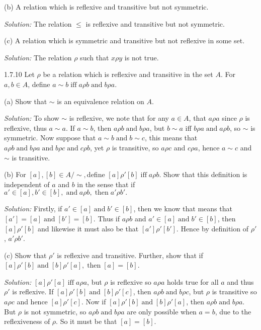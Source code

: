 \documentclass{letter}
\newcommand{\tmop}[1]{\ensuremath{\operatorname{#1}}}
\newcommand{\tmtextit}[1]{{\itshape{#1}}}
\begin{document}
(b) A relation which is reflexive and transitive but not symmetric.

\tmtextit{Solution:} The relation $\leq$ is reflexive and transitive but not
symmetric.

(c) A relation which is symmetric and transitive but not reflexive in some
set.

\tmtextit{Solution:} The relation $\rho$ such that $x \rho y$ is not true.

1.7.10 Let $\rho$ be a relation which is reflexive and transitive in the set
$A$. For $a, b \in A$, define $a \sim b \tmop{iff} a \rho b \tmop{and} b \rho
a$.

(a) Show that $\sim$ is an equivalence relation on $A$.

\tmtextit{Solution:} To show $\sim$ is reflexive, we note that for any $a \in
A$, that $a \rho a$ since $\rho$ is reflexive, thus $a \sim a$. If $a \sim b$,
then $a \rho b \tmop{and} b \rho a$, but $b \sim a$ iff $b \rho a \tmop{and} a
\rho b$, so $\sim$ is symmetric. Now suppose that $a \sim b \tmop{and} b \sim
c$, this means that $a \rho b \tmop{and} b \rho a \tmop{and} b \rho c
\tmop{and} c \rho b$, yet $\rho$ is transitive, so $a \rho c$ and $c \rho a$,
hence $a \sim c$ and $\sim$ is transitive.

(b) For $[a], [b] \in A / \sim,$define $[a] \rho' [b] \tmop{iff} a \rho b$.
Show that this definition is independent of $a$ and $b$ in the sense that if
$a' \in [a], b' \in [b], \tmop{and} a \rho b, \tmop{then} a' \rho b' .$

\tmtextit{Solution:} Firstly, if $a' \in [a] \tmop{and} b' \in [b]$, then we
know that means that $[a'] = [a] \tmop{and} [b'] = [b]$. Thus if $a \rho b$
and $a' \in [a] \tmop{and} b' \in [b]$, then $[a] \rho' [b]$ and likewise it
must also be that $[a'] \rho' [b']$. Hence by definition of $\rho'$, $a' \rho
b'$.

(c) Show that $\rho'$ is reflexive and transitive. Further, show that if $[a]
\rho' [b] \tmop{and} [b] \rho' [a], \tmop{then} [a] = [b]$.

\tmtextit{Solution:} $[a] \rho' [a] \tmop{iff} a \rho a$, but $\rho$ is
reflexive so $a \rho a$ holds true for all $a$ and thus $\rho'$ is reflexive.
If $[a] \rho' [b] \tmop{and} [b] \rho' [c]$, then $a \rho b \tmop{and} b \rho
c$, but $\rho$ is transitive so $a \rho c$ and hence $[a] \rho' [c]$. Now if
$[a] \rho' [b] \tmop{and} [b] \rho' [a]$, then $a \rho b \tmop{and} b \rho a$.
But $\rho$ is not symmetric, so $a \rho b \tmop{and} b \rho a$ are only
possible when $a = b$, due to the reflexiveness of $\rho$. So it must be that
$[a] = [b]$.
\end{document}
